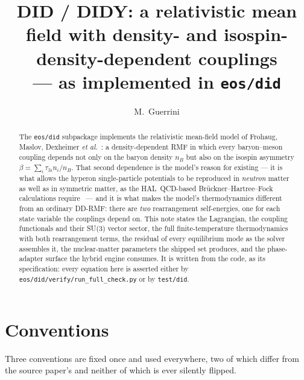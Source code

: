 \documentclass[aps,prc,onecolumn,superscriptaddress,nofootinbib,10pt]{revtex4-2}
\newcommand{\nB}{n_B}
\begin{document}
\title{DID / DIDY: a relativistic mean field with density- and
       isospin-density-dependent couplings \\
       --- as implemented in \texttt{eos/did}}

\author{M.~Guerrini}

\begin{abstract}
The \texttt{eos/did} subpackage implements the relativistic mean-field model of
Frohaug, Maslov, Dexheimer \textit{et al.}~\cite{Frohaug2025}: a density-dependent
RMF in which every baryon--meson coupling depends not only on the baryon
density $\nB$ but also on the isospin asymmetry
$\beta = \sum_i \tau_{3i} n_i / \nB$. That second dependence is the model's
reason for existing --- it is what allows the hyperon single-particle
potentials to be reproduced in \emph{neutron} matter as well as in symmetric
matter, as the HAL~QCD-based Br\"uckner--Hartree--Fock calculations
require~\cite{Kohno2024} --- and it is what makes the model's thermodynamics
different from an ordinary DD-RMF: there are \emph{two} rearrangement
self-energies, one for each state variable the couplings depend on. This note
states the Lagrangian, the coupling functionals and their SU(3) vector sector,
the full finite-temperature thermodynamics with both rearrangement terms, the
residual of every equilibrium mode as the solver assembles it, the
nuclear-matter parameters the shipped set produces, and the phase-adapter
surface the hybrid engine consumes. It is written from the code, as its
specification: every equation here is asserted either by
\texttt{eos/did/verify/run\_full\_check.py} or by \texttt{test/did}.
\end{abstract}

\maketitle

\section{Conventions}
\label{sec:conventions}

Three conventions are fixed once and used everywhere, two of which differ from
the source paper's and neither of which is ever silently flipped.
\end{document}
